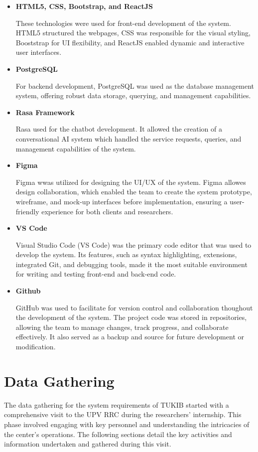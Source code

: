 \begin{itemize}
	\item \textbf{HTML5, CSS, Bootstrap, and ReactJS}
	
	These technologies were used for front-end development of the system. HTML5 structured the webpages, CSS was responsible for the visual styling, Booststrap for UI $ $flexibility, and ReactJS enabled dynamic and interactive user interfaces.
	
	\item \textbf{PostgreSQL}
	
	For backend development, PostgreSQL was used as the database management system, offering robust data storage, querying, and management capabilities.
	
	\item \textbf{Rasa Framework}
	
	Rasa used for the chatbot development. It allowed the creation of a conversational AI system which handled the service requests, queries, and management capabilities of the system.
	
	\item \textbf{Figma}
	
	Figma wwas utilized for designing the UI/UX of the system. Figma allowes design collaboration, which enabled the team to create the system prototype, wireframe, and mock-up interfaces before implementation, ensuring a user-friendly experience for both clients and researchers.
	
	\item \textbf{VS Code}
	
	Visual Studio Code (VS Code) was the primary code editor that was used to develop the system. Its features, such as syntax highlighting, extensions, integrated Git, and debugging tools, made it the most suitable environment for writing and testing front-end and back-end code.
	
	\item \textbf{Github}
	
	GitHub was used to facilitate for version control and collaboration thoughout the development of the system. The project code was stored in repositories, allowing the team to manage changes, track progress, and collaborate effectively. It also served as a backup and source for future development or modification.
	
\end{itemize}

\section{Data Gathering}
The data gathering for the system requirements of TUKIB started with a comprehensive visit to the UPV RRC during the researchers' internship. This phase involved engaging with key personnel and understanding the intricacies of the center's operations. The following sections detail the key activities and information undertaken and gathered during this visit.

